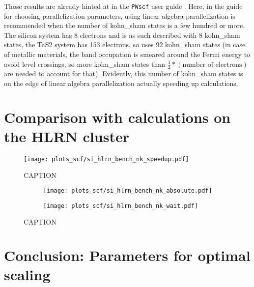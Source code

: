 \documentclass[main.tex]{subfiles}
\begin{document}
Those results are already hinted at in the \texttt{PWscf} user guide \cite{noauthor_pwscf_nodate}.
Here, in the guide for choosing parallelization parameters, using linear algebra parallelization is recommended when the number of \acrshort{kohn_sham} states is a few hundred or more.
The silicon system has 8 electrons and is as such described with 8 \gls{kohn_sham} states, the TaS2 system has 153 electrons, so \QE uses 92 \gls{kohn_sham} states (in case of metallic materials, the band occupation is smeared around the Fermi energy to avoid level crossings, so more \gls{kohn_sham} states than \(\frac{1}{2} * (\textrm{number of electrons})\) are needed to account for that).
Evidently, this number of \acrshort{kohn_sham} states is on the edge of linear algebra parallelization actually speeding up calculations.

\section{Comparison with calculations on the HLRN cluster}

\begin{figure}[ht!]
\centering
\texttt{[image: plots\_scf/si\_hlrn\_bench\_nk\_speedup.pdf]}
\caption{CAPTION}
\label{fig:scaling_scf_hlrn_nk_si_speedup}
\end{figure}

\begin{figure}[ht!]
\begin{subfigure}[b]{0.49\textwidth}
    \centering
    \texttt{[image: plots\_scf/si\_hlrn\_bench\_nk\_absolute.pdf]}
\end{subfigure}
\begin{subfigure}[b]{0.49\textwidth}
    \centering
    \texttt{[image: plots\_scf/si\_hlrn\_bench\_nk\_wait.pdf]}
\end{subfigure}
\caption{CAPTION}
\label{fig:scaling_scf_hlrn_nprocs_nk_absolute_wait}
\end{figure}

\section{Conclusion: Parameters for optimal scaling}
\end{document}
